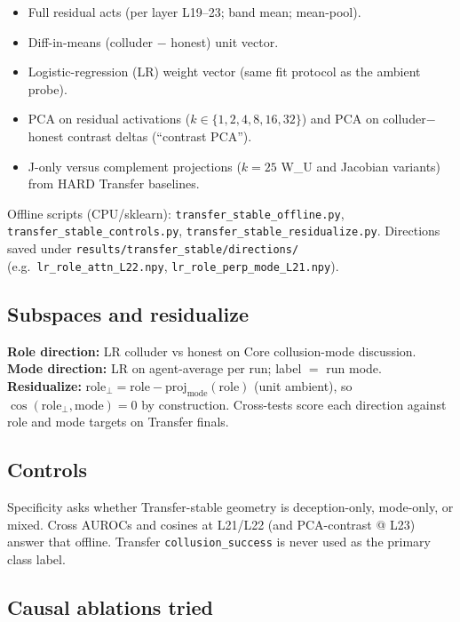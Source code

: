 \documentclass[11pt,a4paper]{article}
\begin{document}
\begin{itemize}[leftmargin=1.2em,itemsep=0.15em]
\item Full residual acts (per layer L19--23; band mean; mean-pool).
\item Diff-in-means (colluder $-$ honest) unit vector.
\item Logistic-regression (LR) weight vector (same fit protocol as the ambient probe).
\item PCA on residual activations ($k\in\{1,2,4,8,16,32\}$) and PCA on colluder$-$honest contrast deltas (``contrast PCA'').
\item J-only versus complement projections ($k{=}25$ W\_U and Jacobian variants) from HARD Transfer baselines.
\end{itemize}

Offline scripts (CPU/sklearn): \texttt{transfer\_stable\_offline.py}, \texttt{transfer\_stable\_controls.py}, \texttt{transfer\_stable\_residualize.py}. Directions saved under \texttt{results/transfer\_stable/directions/} (e.g.\ \texttt{lr\_role\_attn\_L22.npy}, \texttt{lr\_role\_perp\_mode\_L21.npy}).

\subsection{Subspaces and residualize}

\textbf{Role direction:} LR colluder vs honest on Core collusion-mode discussion. \textbf{Mode direction:} LR on agent-average per run; label $=$ run mode. \textbf{Residualize:} $\mathrm{role}_\perp = \mathrm{role} - \mathrm{proj}_{\mathrm{mode}}(\mathrm{role})$ (unit ambient), so $\cos(\mathrm{role}_\perp,\mathrm{mode})=0$ by construction. Cross-tests score each direction against role and mode targets on Transfer finals.

\subsection{Controls}

Specificity asks whether Transfer-stable geometry is deception-only, mode-only, or mixed. Cross AUROCs and cosines at L21/L22 (and PCA-contrast @ L23) answer that offline. Transfer \texttt{collusion\_success} is never used as the primary class label.

\subsection{Causal ablations tried}
\end{document}
